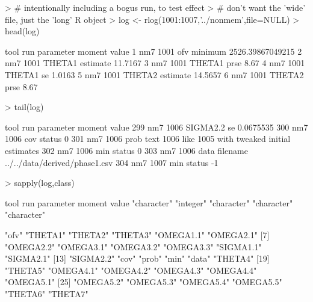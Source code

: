 \begin{Schunk}
\begin{Sinput}
> # intentionally including a bogus run, to test effect
> # don't want the 'wide' file, just the 'long' R object
> log <- rlog(1001:1007,'../nonmem',file=NULL) 
> head(log)
\end{Sinput}
\begin{Soutput}
  tool  run parameter   moment            value
1  nm7 1001       ofv  minimum 2526.39867049215
2  nm7 1001    THETA1 estimate          11.7167
3  nm7 1001    THETA1     prse             8.67
4  nm7 1001    THETA1       se           1.0163
5  nm7 1001    THETA2 estimate          14.5657
6  nm7 1001    THETA2     prse             8.67
\end{Soutput}
\begin{Sinput}
> tail(log)
\end{Sinput}
\begin{Soutput}
    tool  run parameter   moment                                         value
299  nm7 1006  SIGMA2.2       se                                     0.0675535
300  nm7 1006       cov   status                                             0
301  nm7 1006      prob     text 1006 like 1005 with tweaked initial estimates
302  nm7 1006       min   status                                             0
303  nm7 1006      data filename                 ../../data/derived/phase1.csv
304  nm7 1007       min   status                                            -1
\end{Soutput}
\begin{Sinput}
> sapply(log,class)
\end{Sinput}
\begin{Soutput}
       tool         run   parameter      moment       value 
"character"   "integer" "character" "character" "character" 
\end{Soutput}
\begin{Soutput}
 [1] "ofv"      "THETA1"   "THETA2"   "THETA3"   "OMEGA1.1" "OMEGA2.1"
 [7] "OMEGA2.2" "OMEGA3.1" "OMEGA3.2" "OMEGA3.3" "SIGMA1.1" "SIGMA2.1"
[13] "SIGMA2.2" "cov"      "prob"     "min"      "data"     "THETA4"  
[19] "THETA5"   "OMEGA4.1" "OMEGA4.2" "OMEGA4.3" "OMEGA4.4" "OMEGA5.1"
[25] "OMEGA5.2" "OMEGA5.3" "OMEGA5.4" "OMEGA5.5" "THETA6"   "THETA7"  
\end{Soutput}
\begin{Sinput}

\end{Sinput}
\end{Schunk}
